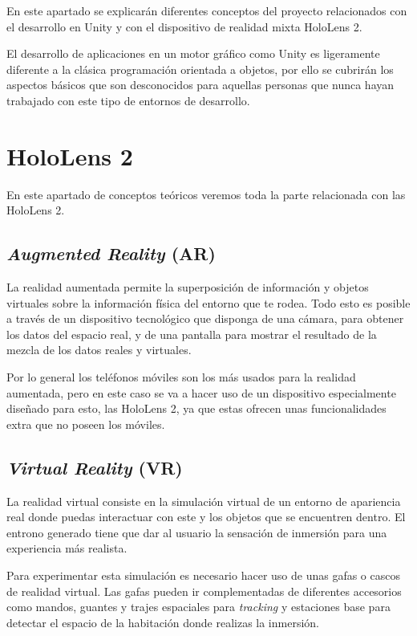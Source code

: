 
En este apartado se explicarán diferentes conceptos del proyecto relacionados con el desarrollo en Unity y con el dispositivo de realidad mixta HoloLens 2.

El desarrollo de aplicaciones en un motor gráfico como Unity es ligeramente diferente a la clásica programación orientada a objetos, por ello se cubrirán los aspectos básicos que son desconocidos para aquellas personas que nunca hayan trabajado con este tipo de entornos de desarrollo.

\section{HoloLens 2}

En este apartado de conceptos teóricos veremos toda la parte relacionada con las HoloLens 2.

\subsection{\textit{Augmented Reality} (AR)}

La realidad aumentada \cite{wiki:ar} permite la superposición de información y objetos virtuales sobre la información física del entorno que te rodea. Todo esto es posible a través de un dispositivo tecnológico que disponga de una cámara, para obtener los datos del espacio real, y de una pantalla para mostrar el resultado de la mezcla de los datos reales y virtuales.

Por lo general los teléfonos móviles son los más usados para la realidad aumentada, pero en este caso se va a hacer uso de un dispositivo especialmente diseñado para esto, las HoloLens 2, ya que estas ofrecen unas funcionalidades extra que no poseen los móviles.

\subsection{\textit{Virtual Reality} (VR)}

La realidad virtual \cite{wiki:vr} consiste en la simulación virtual de un entorno de apariencia real donde puedas interactuar con este y los objetos que se encuentren dentro. El entrono generado tiene que dar al usuario la sensación de inmersión para una experiencia más realista. 

Para experimentar esta simulación es necesario hacer uso de unas gafas o cascos de realidad virtual. Las gafas pueden ir complementadas de diferentes accesorios como mandos, guantes y trajes espaciales para \textit{tracking} y estaciones base para detectar el espacio de la habitación donde realizas la inmersión.


